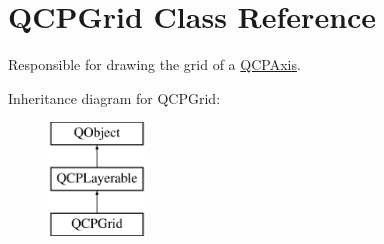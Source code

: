 \hypertarget{class_q_c_p_grid}{}\section{Q\+C\+P\+Grid Class Reference}
\label{class_q_c_p_grid}


Responsible for drawing the grid of a \hyperlink{class_q_c_p_axis}{Q\+C\+P\+Axis}.  


Inheritance diagram for Q\+C\+P\+Grid\+:\begin{figure}[H]
\begin{center}
\leavevmode
\includegraphics[height=3.000000cm]{class_q_c_p_grid}
\end{center}
\end{figure}
